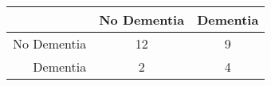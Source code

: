 \begin{table}[ht]
\centering
\begin{tabular}{r|c|c}
  \hline
 & No Dementia & Dementia \\ 
  \hline
No Dementia & 12 & 9 \\ 
  Dementia & 2 & 4 \\ 
   \hline
\end{tabular}
\end{table}

